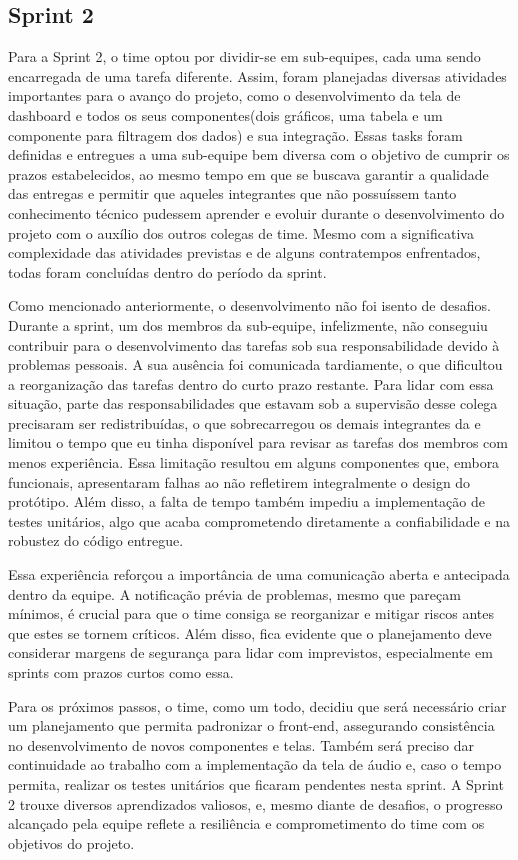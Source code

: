 \subsection{Sprint 2}
Para a Sprint 2, o time optou por dividir-se em sub-equipes, cada uma sendo encarregada de uma tarefa diferente. Assim, foram planejadas diversas atividades importantes para o avanço do projeto, como o desenvolvimento da tela de dashboard e todos os seus componentes(dois gráficos, uma tabela e um componente para filtragem dos dados) e sua integração. Essas tasks foram definidas e entregues a uma sub-equipe bem diversa com o objetivo de cumprir os prazos estabelecidos, ao mesmo tempo em que se buscava garantir a qualidade das entregas e permitir que aqueles integrantes que não possuíssem tanto conhecimento técnico pudessem aprender e evoluir durante o desenvolvimento do projeto com o auxílio dos outros colegas de time. Mesmo com a significativa complexidade das atividades previstas e de alguns contratempos enfrentados, todas foram concluídas dentro do período da sprint.

Como mencionado anteriormente, o desenvolvimento não foi isento de desafios. Durante a sprint, um dos membros da sub-equipe, infelizmente, não conseguiu contribuir para o desenvolvimento das tarefas sob sua responsabilidade devido à problemas pessoais. A sua ausência foi comunicada tardiamente, o que dificultou a reorganização das tarefas dentro do curto prazo restante. Para lidar com essa situação, parte das responsabilidades que estavam sob a supervisão desse colega precisaram ser redistribuídas, o que sobrecarregou os demais integrantes da e limitou o tempo que eu tinha disponível para revisar as tarefas dos membros com menos experiência. Essa limitação resultou em alguns componentes que, embora funcionais, apresentaram falhas ao não refletirem integralmente o design do protótipo. Além disso, a falta de tempo também impediu a implementação de testes unitários, algo que acaba comprometendo diretamente a confiabilidade e na robustez do código entregue.

Essa experiência reforçou a importância de uma comunicação aberta e antecipada dentro da equipe. A notificação prévia de problemas, mesmo que pareçam mínimos, é crucial para que o time consiga se reorganizar e mitigar riscos antes que estes se tornem críticos. Além disso, fica evidente que o planejamento deve considerar margens de segurança para lidar com imprevistos, especialmente em sprints com prazos curtos como essa.

Para os próximos passos, o time, como um todo, decidiu que será necessário criar um planejamento que permita padronizar o front-end, assegurando consistência no desenvolvimento de novos componentes e telas. Também será preciso dar continuidade ao trabalho com a implementação da tela de áudio e, caso o tempo permita, realizar os testes unitários que ficaram pendentes nesta sprint. A Sprint 2 trouxe diversos aprendizados valiosos, e, mesmo diante de desafios, o progresso alcançado pela equipe reflete a resiliência e comprometimento do time com os objetivos do projeto.
